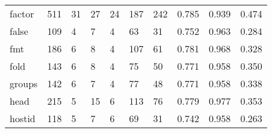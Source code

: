 \begin{longtable}{lp{1.3cm}p{1.3cm}p{1.3cm}p{1.3cm}p{1.3cm}p{1.3cm}p{1.3cm}p{1.3cm}p{1.3cm}}
factor    &                    511 &                                 31 &                                27 &                               24 &                               187 &                             242 &                                   0.785 &                                  0.939 &                                0.474 \\
false     &                    109 &                                  4 &                                 7 &                                4 &                                63 &                              31 &                                   0.752 &                                  0.963 &                                0.284 \\
fmt       &                    186 &                                  6 &                                 8 &                                4 &                               107 &                              61 &                                   0.781 &                                  0.968 &                                0.328 \\
fold      &                    143 &                                  6 &                                 8 &                                4 &                                75 &                              50 &                                   0.771 &                                  0.958 &                                0.350 \\
groups    &                    142 &                                  6 &                                 7 &                                4 &                                77 &                              48 &                                   0.771 &                                  0.958 &                                0.338 \\
head      &                    215 &                                  5 &                                15 &                                6 &                               113 &                              76 &                                   0.779 &                                  0.977 &                                0.353 \\
hostid    &                    118 &                                  5 &                                 7 &                                6 &                                69 &                              31 &                                   0.742 &                                  0.958 &                                0.263 \\

\end{longtable}
